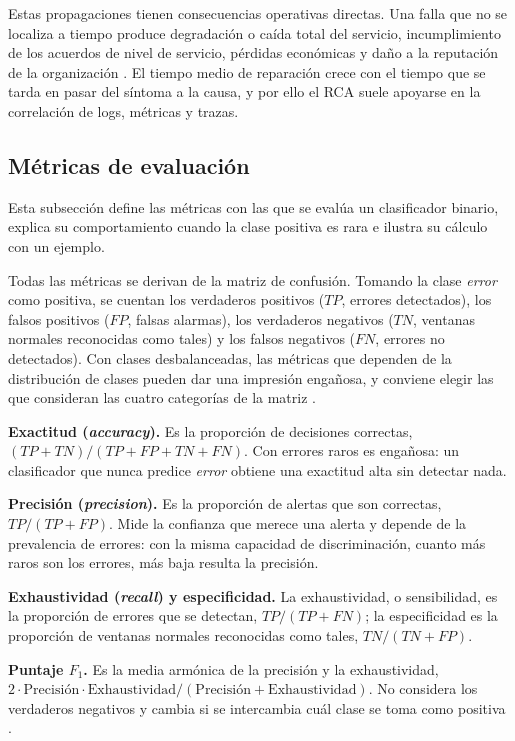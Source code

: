 Estas propagaciones tienen consecuencias operativas directas. Una falla que no se localiza a tiempo produce degradación o caída total del servicio, incumplimiento de los acuerdos de nivel de servicio, pérdidas económicas y daño a la reputación de la organización \cite{wang2024_rca}. El tiempo medio de reparación crece con el tiempo que se tarda en pasar del síntoma a la causa, y por ello el RCA suele apoyarse en la correlación de logs, métricas y trazas.

\subsection{Métricas de evaluación}\label{sec:mt_metricas}

Esta subsección define las métricas con las que se evalúa un clasificador binario, explica su comportamiento cuando la clase positiva es rara e ilustra su cálculo con un ejemplo.

Todas las métricas se derivan de la matriz de confusión. Tomando la clase \emph{error} como positiva, se cuentan los verdaderos positivos ($TP$, errores detectados), los falsos positivos ($FP$, falsas alarmas), los verdaderos negativos ($TN$, ventanas normales reconocidas como tales) y los falsos negativos ($FN$, errores no detectados). Con clases desbalanceadas, las métricas que dependen de la distribución de clases pueden dar una impresión engañosa, y conviene elegir las que consideran las cuatro categorías de la matriz \cite{diallo2025_metrics}.

\textbf{Exactitud (\textit{accuracy}).} Es la proporción de decisiones correctas, $(TP + TN)/(TP + FP + TN + FN)$. Con errores raros es engañosa: un clasificador que nunca predice \emph{error} obtiene una exactitud alta sin detectar nada.

\textbf{Precisión (\textit{precision}).} Es la proporción de alertas que son correctas, $TP/(TP + FP)$. Mide la confianza que merece una alerta y depende de la prevalencia de errores: con la misma capacidad de discriminación, cuanto más raros son los errores, más baja resulta la precisión.

\textbf{Exhaustividad (\textit{recall}) y especificidad.} La exhaustividad, o sensibilidad, es la proporción de errores que se detectan, $TP/(TP + FN)$; la especificidad es la proporción de ventanas normales reconocidas como tales, $TN/(TN + FP)$.

\textbf{Puntaje $F_1$.} Es la media armónica de la precisión y la exhaustividad, $2 \cdot \mathrm{Precisión} \cdot \mathrm{Exhaustividad} / (\mathrm{Precisión} + \mathrm{Exhaustividad})$. No considera los verdaderos negativos y cambia si se intercambia cuál clase se toma como positiva \cite{chicco2020_mcc}.

